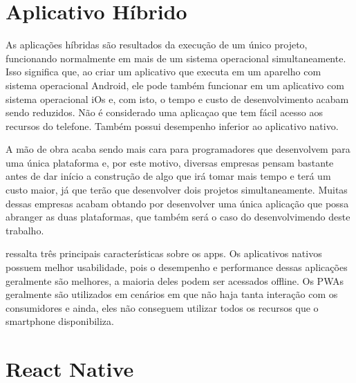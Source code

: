 
\section{Aplicativo Híbrido}
As aplicações híbridas são resultados da execução de um único projeto, funcionando normalmente em mais de um sistema operacional simultaneamente. Isso significa que, ao criar um aplicativo que executa em um aparelho com sistema operacional Android, ele pode também funcionar em um aplicativo com sistema operacional iOs e, com isto, o tempo e custo de desenvolvimento acabam sendo reduzidos. Não é considerado uma aplicaçao que tem fácil acesso aos recursos do telefone. Também possui desempenho inferior ao aplicativo nativo. \cite{apps}

A mão de obra acaba sendo mais cara para programadores que desenvolvem para uma única plataforma e, por este motivo, diversas empresas pensam bastante antes de dar início a construção de algo que irá tomar mais tempo e terá um custo maior, já que terão que desenvolver dois projetos simultaneamente. Muitas dessas empresas acabam obtando por desenvolver uma única aplicação que possa abranger as duas plataformas, que também será o caso do desenvolvimendo deste trabalho. 

 ressalta três principais características sobre os apps. Os aplicativos nativos possuem melhor usabilidade, pois o desempenho e performance dessas aplicações geralmente são melhores, a maioria deles podem ser acessados offline. Os PWAs geralmente são utilizados em cenários em que não haja tanta interação com os consumidores e ainda, eles não conseguem utilizar todos os recursos que o smartphone disponibiliza.




\section{React Native}

